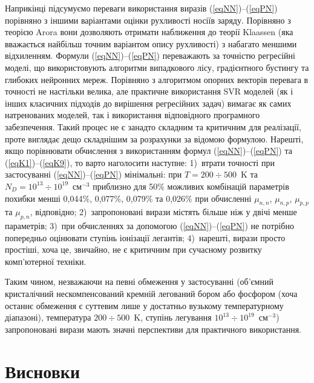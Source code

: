 \documentclass[12pt,a4paper,titlepage,oneside]{book}
\numberwithin{equation}{part}
\begin{document}
Наприкінці підсумуємо переваги використання виразів (\ref{eqNN})--(\ref{eqPN}) порівняно з іншими варіантами оцінки рухливості носіїв заряду.
Порівняно з теорією Arora вони дозволяють отримати наближення до теорії Klaassen (яка вважається найбільш точним варіантом опису рухливості)
з набагато меншими відхиленням.
Формули (\ref{eqNN})--(\ref{eqPN}) переважають за точністю регресійні моделі, що використовують алгоритми
випадкового лісу, градієнтного бустингу та глибоких нейронних мереж.
Порівняно з алгоритмом опорних векторів перевага в точності не настільки велика, але
практичне використання SVR моделей (як і інших класичних підходів до вирішення регресійних задач)
вимагає як самих натренованих моделей, так і використання відповідного програмного забезпечення.
Такий процес не є занадто складним та критичним для реалізації, проте виглядає дещо складнішим за розрахунки за відомою формулою.
Нарешті, якщо порівнювати обчислення з використанням формул (\ref{eqNN})--(\ref{eqPN}) та (\ref{eqK1})--(\ref{eqK9}),
то варто наголосити наступне:
1)~втрати точності при застосуванні (\ref{eqNN})--(\ref{eqPN}) мінімальні:
при $T=200\div500$~K та $N_D=10^{13}\div10^{19}$~см$^{-3}$ приблизно для 50\% можливих комбінацій параметрів
похибки менші  0,044\%, 0,077\%, 0,079\% та 0,026\% при обчисленні
$\mu_{n,n}$, $\mu_{n,p}$, $\mu_{p,p}$ та $\mu_{p,n}$, відповідно;
2)~запропоновані вирази містять більше ніж у двічі менше параметрів;
3)~при обчисленнях за допомогою (\ref{eqNN})--(\ref{eqPN}) не потрібно попередньо оцінювати ступінь іонізації легантів;
4)~нарешті, вирази просто простіші, хоча це, звичайно, не є критичним при сучасному розвитку комп'ютерної техніки.

Таким чином, незважаючи на певні обмеження у застосуванні
(об'ємний кристалічний нескомпенсований кремній легований бором або фосфором
(хоча останнє обмеження є суттевим лише у достатньо вузькому температурному діапазоні),
температура $200\div500$~K, ступінь легування $10^{13}\div10^{19}$~см$^{-3}$)
запропоновані вирази мають значні перспективи для практичного використання.




\chapter*{Висновки}
\end{document}
